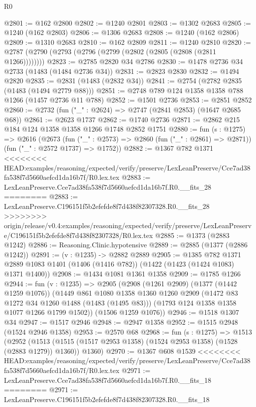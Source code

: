 \begin{lexlean}{R0}
\begin{coremodule}
{{{{{{{{{{{{{{{{{{{{{{{{{{{{{{{{{{{{{{{{{{{{{{{{{{{{{{{{{{{{{{{{{{{{{{{{{{{{{{{{{{{{{{@2801 := @162 @2800
@2802 := @1240 @2801
@2803 := @1302 @2683
@2805 := @1240 (@162 @2803)
@2806 := @1306 @2683
@2808 := @1240 (@162 @2806)
@2809 := @1310 @2683
@2810 := @162 @2809
@2811 := @1240 @2810
@2820 := @2787 (@2790 (@2793 (@2796 (@2799 (@2802 (@2805 (@2808 (@2811 @1266))))))))
@2823 := @2785 @2820 @34 @2786
@2830 := @1478 @2736 @34 @2733 (@1483 (@1484 @2736 @34))
@2831 := @2823 @2830
@2832 := @1494 @2820
@2835 := @2831 (@1483 (@2832 @34))
@2841 := @2754 (@2782 @2835 (@1483 (@1494 @2779 @88)))
@2851 := @2748 @789 @124 @1358 @1358 @788 @1266 (@1457 @2736 @11 @788)
@2852 := @1501 @2736
@2853 := @2851 @2852
@2860 := @2732 (fun ("_" : @2624) => @2747 (@2841 @2853) (@1647 @2685 @68))
@2861 := @2623 @1737
@2862 := @1740 @2736
@2871 := @2862 @215 @184 @124 @1358 @1358 @1266 @1748 @2852 @1751
@2880 := fun (s : @1275) =>
  @2616
    (@2673
      (fun ("_" : @2573) => @2860 (fun ("_" : @2861) => @2871))
      (fun ("_" : @2572 @1737) => @1752))
@2882 := @1367 @782 @1371
<<<<<<<< HEAD:examples/reasoning/expected/verify/preserve/LexLeanPreserve/Cce7ad38fa538f7d5660aefcd1da16b7f/R0.lex.tex
@2883 := LexLeanPreserve.Cce7ad38fa538f7d5660aefcd1da16b7f.R0.__fits_28
========
@2883 := LexLeanPreserve.C196151f5b2efefde8f7d438f82307328.R0.__fits_28
>>>>>>>> origin/release/v0.4:examples/reasoning/expected/verify/preserve/LexLeanPreserve/C196151f5b2efefde8f7d438f82307328/R0.lex.tex
@2885 := @1373 (@2883 @1242)
@2886 := Reasoning.Clinic.hypotensive
@2889 := @2885 (@1377 (@2886 @1242))
@2891 := (v : @1235) -> @2882 @2889
@2905 := @1385
    @782
    @1371
    @2889
    @1083
    @1401
    (@1406 (@1416 @782))
    (@1422 (@1423 (@1424 @1083) @1371 @1400))
@2908 := @1434 @1081 @1361 @1358
@2909 := @1785 @1266
@2944 := fun (v : @1235) =>
  @2905
    (@2908
      (@1261 @2909)
      (@1377 (@1442 @1259 @1076))
      (@1449
        @861
        @1080
        @1358
        @1360
        @1260
        @2909
        (@1472 @83 @1272 @34 @1260 @1488 (@1483 (@1495 @83)))
        (@1793 @124 @1358 @1358 @1077 @1266 @1799 @1502))
      (@1506 @1259 @1076))
@2946 := @1518 @1307 @34
@2947 := @1517 @2946
@2948 := @2947 @1358
@2952 := @1515 @2948 (@1524 @2946 @1358)
@2953 := @2570 @68
@2968 := fun (s : @1275) =>
  @1513
    (@2952
      (@1513 (@1515 (@1517 @2953 @1358) (@1524 @2953 @1358) (@1528 (@2883 @1279)) @1360))
      @1360)
@2970 := @1367 @608 @1539
<<<<<<<< HEAD:examples/reasoning/expected/verify/preserve/LexLeanPreserve/Cce7ad38fa538f7d5660aefcd1da16b7f/R0.lex.tex
@2971 := LexLeanPreserve.Cce7ad38fa538f7d5660aefcd1da16b7f.R0.__fits_18
========
@2971 := LexLeanPreserve.C196151f5b2efefde8f7d438f82307328.R0.__fits_18
}}}}}}}}}}}}}}}}}}}}}}}}}}}}}}}}}}}}}}}}}}}}}}}}}}}}}}}}}}}}}}}}}}}}}}}}}}}}}}}}}}}}}}
\end{coremodule}
\end{lexlean}
